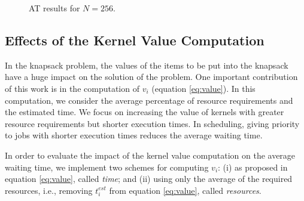 \documentclass[conference]{IEEEtran}
\begin{document}
\begin{figure}[htb]
\begin{center}
\end{center}
\caption{AT results for $N=256$.}
\label{fig:256kernels}
\end{figure}

\subsection{Effects of the Kernel Value Computation}

In the knapsack problem, the values of the items to be put into the knapsack have a huge impact on the solution of the problem. One important contribution of this work is in the computation of $v_i$ (equation \eqref{eq:value}). In this computation, we consider the average percentage of resource requirements and the estimated time. We focus on increasing the value of kernels with greater resource requirements but shorter execution times. In scheduling, giving priority to jobs with shorter execution times reduces the average waiting time.

In order to evaluate the impact of the kernel value computation on the average waiting time, we implement two schemes for computing $v_i$: (i) as proposed in equation \eqref{eq:value}, called \textit{time}; and (ii) using only the average of the required resources, i.e., removing $t^{est}_i$ from equation \eqref{eq:value}, called  \textit{resources}.

\end{document}
